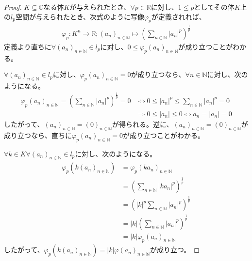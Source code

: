 \documentclass[dvipdfmx]{jsarticle}
\begin{document}
\begin{proof}
$K \subseteq \mathbb{C}$なる体$K$が与えられたとき、$\forall p \in \mathbb{R}$に対し、$1 \leq p$としてその体$K$上の$l_{p}$空間が与えられたとき、次式のように写像$\varphi_{p}$が定義されれば、
\begin{align*}
\varphi_{p}:K^{n} \rightarrow \mathbb{R};\left( a_{n} \right)_{n \in \mathbb{N}} \mapsto \left( \sum_{n \in \mathbb{N}} \left| a_{n} \right|^{p} \right)^{\frac{1}{p}}
\end{align*}
定義より直ちに$\forall\left( a_{n} \right)_{n \in \mathbb{N}} \in l_{p}$に対し、$0 \leq \varphi_{p}\left( a_{n} \right)_{n \in \mathbb{N}}$が成り立つことがわかる。\par
$\forall\left( a_{n} \right)_{n \in \mathbb{N}} \in l_{p}$に対し、$\varphi_{p}\left( a_{n} \right)_{n \in \mathbb{N}} = 0$が成り立つなら、$\forall n \in \mathbb{N}$に対し、次のようになる。
\begin{align*}
\varphi_{p}\left( a_{n} \right)_{n \in \mathbb{N}} = \left( \sum_{n \in \mathbb{N}} \left| a_{n} \right|^{p} \right)^{\frac{1}{p}} = 0 &\Leftrightarrow 0 \leq \left| a_{n} \right|^{p} \leq \sum_{n \in \mathbb{N}} \left| a_{n} \right|^{p} = 0\\
&\Rightarrow 0 \leq \left| a_{n} \right| \leq 0 \Leftrightarrow a_{n} = \left| a_{n} \right| = 0
\end{align*}
したがって、$\left( a_{n} \right)_{n \in \mathbb{N}} = (0)_{n \in \mathbb{N}}$が得られる。逆に、$\left( a_{n} \right)_{n \in \mathbb{N}} = (0)_{n \in \mathbb{N}}$が成り立つなら、直ちに$\varphi_{p}\left( a_{n} \right)_{n \in \mathbb{N}} = 0$が成り立つことがわかる。\par
$\forall k \in K\forall\left( a_{n} \right)_{n \in \mathbb{N}} \in l_{p}$に対し、次のようになる。
\begin{align*}
\varphi_{p}\left( k\left( a_{n} \right)_{n \in \mathbb{N}} \right) &= \varphi_{p}\left( ka_{n} \right)_{n \in \mathbb{N}}\\
&= \left( \sum_{n \in \mathbb{N}} \left| ka_{n} \right|^{p} \right)^{\frac{1}{p}}\\
&= \left( |k|^{p}\sum_{n \in \mathbb{N}} \left| a_{n} \right|^{p} \right)^{\frac{1}{p}}\\
&= |k|\left( \sum_{n \in \mathbb{N}} \left| a_{n} \right|^{p} \right)^{\frac{1}{p}}\\
&= |k|\varphi_{p}\left( a_{n} \right)_{n \in \mathbb{N}}
\end{align*}
したがって、$\varphi_{p}\left( k\left( a_{n} \right)_{n \in \mathbb{N}} \right) = |k|\varphi\left( a_{n} \right)_{n \in \mathbb{N}}$が成り立つ。\par

\end{proof}
\end{document}

